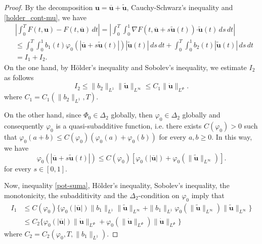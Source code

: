 \documentclass[twoside]{article}
\theoremstyle{remark}
\newcommand{\orlnor}{\|_{L^{\Phi}}}
\renewcommand{\b}[1]{\boldsymbol{#1}}
\newcommand{\ccdot}{\b{\cdot}}
\renewcommand{\leq}{\leqslant}
\renewcommand{\geq}{\geqslant}
\begin{document}
\begin{proof}
By the decomposition $\b{u}=\overline{\b{u}}+\b{\tilde{u}}$,   Cauchy-Schwarz's inequality 
and \eqref{holder_cont-mu}, we have
\begin{equation}\label{cota-diferencia-F}
\begin{split}
&\left|\int_0^T F(t,\b{u})-F(t,\b{\overline{u}})\,dt\right|=
\left|\int_0^T \int_0^1 \nabla F(t,\b{\overline{u}}+s\b{\tilde{u}}(t))\ccdot \b{\tilde{u}}(t) \,ds \,dt\right|
\\
&\leq \int_0^T \int_0^1 b_1(t)\varphi_0(|\b{\overline{u}}+s\b{\tilde{u}}(t)|)|\b{\tilde{u}}(t)|\,ds\,dt+
\int_0^T \int_0^1 b_2(t)|\b{\tilde{u}}(t)|\,ds\,dt
\\
&=I_1+I_2.
\end{split}
\end{equation}
On the one hand, by H\"older's inequality and Sobolev's inequality, we estimate $I_2$ as follows
\begin{equation}\label{cota-i2}
I_2\leq \|b_2\|_{L^1} \|\b{\tilde{u}}\|_{L^{\infty}}\leq
C_1\|\b{\dot u}\orlnor.
\end{equation}
 where $C_1=C_1(\|b_2\|_{L^1}, T)$. 

On the other hand, since $\Phi_0 \in \Delta_2$ globally, then $\varphi_0 \in \Delta_2$ globally and 
consequently $\varphi_0$ is a quasi-subadditive function, i.e. there exists $C(\varphi_0)>0$ such that 
$\varphi_0(a+b)\leq C(\varphi_0)(\varphi_0(a)+\varphi_0(b))$ for every $a,b\geq 0$.
In this way, we have
\begin{equation}\label{pot-suma}
\varphi_0(|\b{\overline{u}}+s\b{\tilde{u}}(t)|)\leq
C(\varphi_0)[\varphi_0(|\b{\overline{u}}|)+\varphi_0(\|\b{\tilde{u}}\|_{L^{\infty}})].
\end{equation}
for every $s \in [0,1]$. 

Now,  inequality \eqref{pot-suma}, H\"older's inequality, Sobolev's inequality,
 the monotonicity, the subadditivity and  the $\Delta_2$-condition on $\varphi_0$ imply that
\begin{equation}\label{cota-i1}
\begin{split}
I_1&
\leq C(\varphi_0)\bigg\{ \varphi_0(|\b{\overline{u}}|) \|b_1\|_{L^1} \|\b{\tilde{u}}\|_{L^{\infty}}+
 \|b_1\|_{L^1}\varphi_0(\|\b{\tilde{u}}\|_{L^\infty})\|\b{\tilde{u}}\|_{L^\infty}\bigg\}
\\
&\leq C_2 \bigg\{ \varphi_0(|\b{\overline{u}}|) \|\b{\dot{u}}\orlnor
+\varphi_0(\|\b{\dot u}\orlnor) \|\b{\dot u}\orlnor\bigg\}
\end{split}
\end{equation}
where $C_2=C_2(\varphi_0,T, \|b_1\|_{L^1} )$. 


\end{proof}
\end{document}
